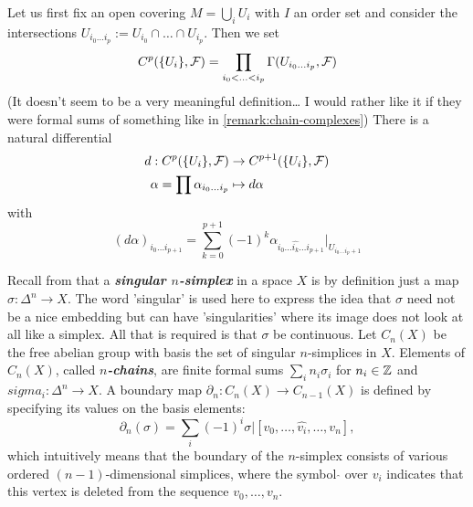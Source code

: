 Let us first fix an open covering $M=\bigcup_iU_i$ with $I$ an order set and consider the intersections $U_{i_0\ldots i_p}:=U_{i_0}\cap\ldots\cap U_{i_p}$. Then we set
\[C^p(\{U_i\},\mathcal{F})=\prod_{i_0<\ldots<i_p}\Gamma(U_{i_0\ldots i_p},\mathcal{F})\]
{\color{cyan}(It doesn't seem to be a very meaningful definition… I would rather like it if they were formal sums of something like in \cref{remark:chain-complexes})} There is a natural differential
\begin{align*}
	d:C^p(\{U_i\},\mathcal{F})&\to C^{p+1}(\{U_i\},\mathcal{F})\\
	\alpha=\prod\alpha_{i_0\ldots i_p}&\mapsto d\alpha
\end{align*}
with
\[(d\alpha)_{i_0\ldots i_{p+1}}=\sum_{k=0}^{p+1}(-1)^k\alpha_{i_0\ldots\widehat{i_k}\ldots i_{p+1}}|_{U_{i_0\ldots i_p+1}}\]
\begin{remark}\label{remark:chain-complexes}
	Recall from \cite{hatcher-at} that a \textbf{\textit{singular $n$-simplex}} in a space $X$ is by definition just a map $\sigma:\Delta^n\to X$. The word 'singular' is used here to express the idea that $\sigma$ need not be a nice embedding but can have 'singularities' where its image does not look at all like a simplex. All that is required is that $\sigma$ be continuous. Let $C_n(X)$ be the free abelian group with basis the set of singular $n$-simplices in $X$. Elements of $C_n(X)$, called \textbf{\textit{$n$-chains}}, are finite formal sums $\sum_in_i\sigma_i$ for $n_i\in\mathbb{Z}$ and $sigma_i:\Delta^n\to X$. A boundary map $\partial_n:C_n(X)\to C_{n-1}(X)$ is defined by specifying its values on the basis elements:
	\[\partial_n(\sigma)=\sum_i(-1)^i\sigma|[v_0,\ldots,\widehat{v_i},\ldots,v_n],\]
	which intuitively means that the boundary of the $n$-simplex consists of various ordered $(n-1)$-dimensional simplices, where the symbol $\hat{}$ over $v_i$ indicates that this vertex is deleted from the sequence $v_0,\ldots,v_n$.
	

\end{remark}
